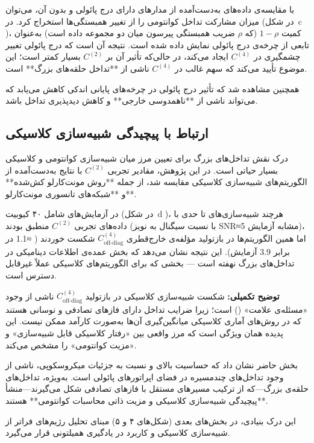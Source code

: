 با مقایسه‌ی داده‌های به‌دست‌آمده از مدارهای دارای درج پائولی و بدون آن، می‌توان میزان مشارکت تداخل کوانتومی را از تغییر همبستگی‌ها استخراج کرد.  
در (در شکل~c \lr{\ref{fig3}})، کمیت \(1-\rho\) (که \(\rho\) ضریب همبستگی پیرسون میان دو مجموعه داده است) به‌عنوان تابعی از چرخه‌ی درج پائولی نمایش داده شده است.  
نتیجه آن است که درج پائولی تغییر چشمگیری در \(C^{(4)}\) ایجاد می‌کند، در حالی‌که تأثیر آن بر \(C^{(2)}\) بسیار کمتر است؛ این موضوع تأیید می‌کند که سهم غالب در \(C^{(4)}\) ناشی از **تداخل حلقه‌های بزرگ** است.

همچنین مشاهده شد که تأثیر درج پائولی در چرخه‌های پایانی اندکی کاهش می‌یابد که می‌تواند ناشی از **ناهمدوسی خارجی** و کاهش دیدپذیری تداخل باشد.
\subsection{ارتباط با پیچیدگی شبیه‌سازی کلاسیکی}

درک نقش تداخل‌های بزرگ برای تعیین مرز میان شبیه‌سازی کوانتومی و کلاسیکی بسیار حیاتی است.  
در این پژوهش، مقادیر تجربی \(C^{(2)}\) با نتایج به‌دست‌آمده از الگوریتم‌های شبیه‌سازی کلاسیکی مقایسه شد، از جمله **روش مونت‌کارلو کش‌شده**
  و **شبکه‌های تانسوری مونت‌کارلو**.

در آزمایش‌های شامل ۴۰ کیوبیت (در شکل~d \lr{\ref{fig3}})، هرچند شبیه‌سازی‌های  تا حدی با داده‌های تجربی \(C^{(2)}\) منطبق بودند (با نسبت سیگنال به نویز SNR≈5 مشابه آزمایش)، اما همین الگوریتم‌ها در بازتولید مؤلفه‌ی خارج‌قطری \(C^{(4)}_{\text{off-diag}}\) شکست خوردند ( ≈1.1 در برابر 3.9 آزمایش).  
این نتیجه نشان می‌دهد که بخش عمده‌ی اطلاعات دینامیکی در تداخل‌های بزرگ نهفته است — بخشی که برای الگوریتم‌های کلاسیکی عملاً غیرقابل دسترس است.

\textbf{توضیح تکمیلی:}  
شکست شبیه‌سازی کلاسیکی در بازتولید \(C^{(4)}_{\text{off-diag}}\) ناشی از وجود «مسئله‌ی علامت» () است؛ زیرا ضرایب تداخل دارای فازهای تصادفی و نوسانی هستند که در روش‌های آماری کلاسیکی میانگین‌گیری آن‌ها به‌صورت کارآمد ممکن نیست.  
این پدیده همان ویژگی است که مرز واقعی بین «رفتار کلاسیکی قابل شبیه‌سازی» و «مزیت کوانتومی» را مشخص می‌کند.

بخش حاضر نشان داد که حساسیت بالای  و  نسبت به جزئیات میکروسکوپی، ناشی از وجود تداخل‌های چندمسیره در فضای اپراتورهای پائولی است.  
به‌ویژه، تداخل‌های حلقه‌ی بزرگ—که از ترکیب مسیرهای مستقل با فازهای تصادفی شکل می‌گیرند—منشأ **پیچیدگی شبیه‌سازی کلاسیکی و مزیت ذاتی محاسبات کوانتومی** هستند.

این درک بنیادی، در بخش‌های بعدی (شکل‌های ۴ و ۵) مبنای تحلیل رژیم‌های فراتر از شبیه‌سازی کلاسیکی و کاربرد  در یادگیری همیلتونی قرار می‌گیرد.
